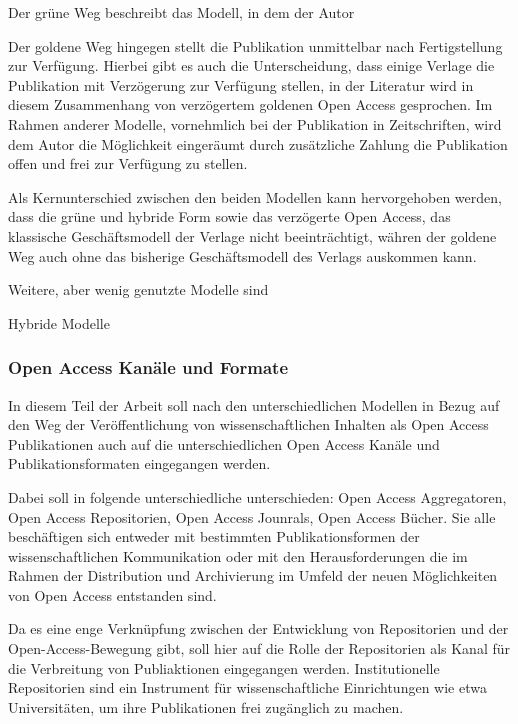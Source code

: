 Der grüne Weg beschreibt das Modell, in dem der Autor

Der goldene Weg hingegen stellt die Publikation unmittelbar nach Fertigstellung zur Verfügung. Hierbei gibt es auch die Unterscheidung, dass einige Verlage die Publikation mit Verzögerung zur Verfügung stellen, in der Literatur wird in diesem Zusammenhang von verzögertem goldenen Open Access gesprochen\cite{lewis_2012_inevitability}. Im Rahmen anderer Modelle, vornehmlich bei der Publikation in Zeitschriften, wird dem Autor die Möglichkeit eingeräumt durch zusätzliche Zahlung die Publikation offen und frei zur Verfügung zu stellen\cite{lewis_2012_inevitability}.

Als Kernunterschied zwischen den beiden Modellen kann hervorgehoben werden, dass die grüne und hybride Form sowie das verzögerte Open Access, das klassische Geschäftsmodell der Verlage nicht beeinträchtigt, währen der goldene Weg auch ohne das bisherige Geschäftsmodell des Verlags auskommen kann\cite{lewis_2012_inevitability}.

Weitere, aber wenig genutzte Modelle sind

Hybride Modelle

\subsubsection{Open Access Kanäle und Formate}
In diesem Teil der Arbeit soll nach den unterschiedlichen Modellen in Bezug auf den Weg der Veröffentlichung von wissenschaftlichen Inhalten als Open Access Publikationen auch auf die unterschiedlichen Open Access Kanäle und Publikationsformaten eingegangen werden.

Dabei soll in folgende unterschiedliche unterschieden: Open Access Aggregatoren, Open Access Repositorien, Open Access Jounrals, Open Access Bücher. Sie alle beschäftigen sich entweder mit bestimmten Publikationsformen der wissenschaftlichen Kommunikation oder mit den Herausforderungen die im Rahmen der Distribution und Archivierung im Umfeld der neuen Möglichkeiten von Open Access entstanden sind. 

Da es eine enge Verknüpfung zwischen der Entwicklung von Repositorien und der Open-Access-Bewegung gibt\cite{offhaus_2012_institutionelle_repos}, soll hier auf die Rolle der Repositorien als Kanal für die Verbreitung von Publiaktionen eingegangen werden. Institutionelle Repositorien sind ein Instrument für wissenschaftliche Einrichtungen wie etwa Universitäten, um ihre Publikationen frei zugänglich zu machen\cite{dobratz_2007_open}.

